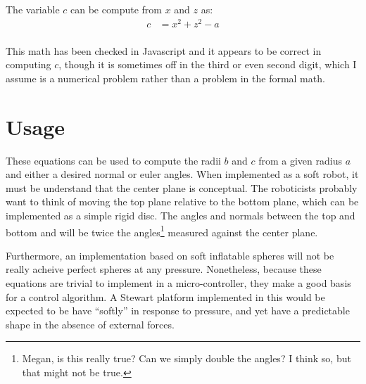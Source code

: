 \documentclass{article}
\begin{document}
The variable $c$ can be compute from $x$ and $z$ as:
\begin{align*}
    c &= x^2 + z^2 -a \\
\end{align*}

This math has been checked in Javascript and it appears to
be correct in computing $c$,
though it is sometimes off in the third or even second digit,
which I assume is a numerical problem
rather than a problem in the formal math.

\section{Usage}

These equations can be used to compute the radii $b$ and $c$
from a given radius $a$ and either a desired normal or euler
angles. When implemented as a soft robot, it must be understand
that the center plane is conceptual. The roboticists probably
want to think of moving the top plane relative to the bottom plane,
which can be implemented as a simple rigid disc.
The angles and normals between the top and bottom and will be
twice the angles\footnote{Megan, is this really true? Can we simply double the angles? I think so, but that might not be true.} measured against the center plane.

Furthermore, an implementation based on soft inflatable spheres
will not be really acheive perfect spheres at any pressure.
Nonetheless, because these equations are trivial to implement
in a micro-controller, they make a good basis for a control
algorithm. A Stewart platform implemented in this would
be expected to be have ``softly'' in response to pressure,
and yet have a predictable shape in the absence of external
forces.

\printbibliography
\end{document}
